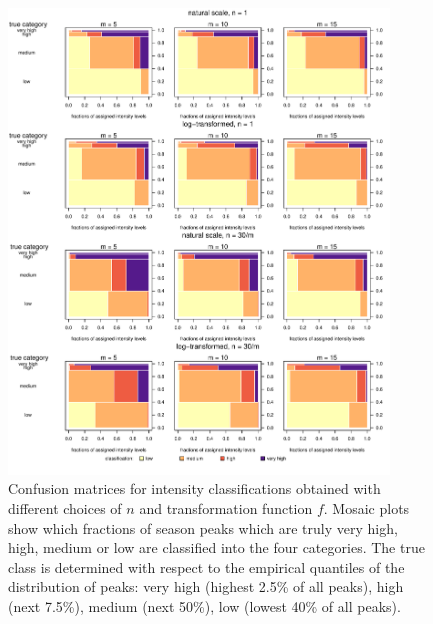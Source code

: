 \documentclass[12pt]{article}
\begin{document}
\begin{figure}
\includegraphics[width=0.9\textwidth]{figure/mosaic_fr.pdf}
\caption{Confusion matrices for intensity classifications obtained with different choices of $n$ and transformation function $f$. Mosaic plots show which fractions of season peaks which are truly very high, high, medium or low are classified into the four categories. The true class is determined with respect to the empirical quantiles of the distribution of peaks: very high (highest 2.5\% of all peaks), high (next 7.5\%), medium (next 50\%), low (lowest 40\% of all peaks).}
\label{fig:mosaic}
\end{figure}

\end{document}
